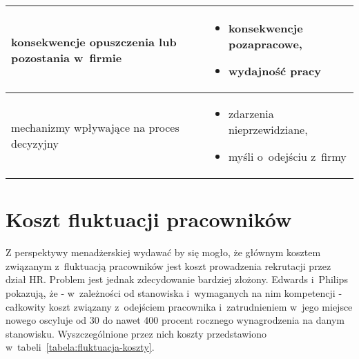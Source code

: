 \begin{table}
\begin{center}
\begin{tabular}{|P{.2\textwidth}|p{.7\textwidth}|}
            konsekwencje opuszczenia lub pozostania w~firmie &
            \begin{itemize}
                \item konsekwencje pozapracowe,
                \item wydajność pracy
            \end{itemize} \\
            \hline

            mechanizmy wpływające na proces decyzyjny &
            \begin{itemize}
                \item zdarzenia nieprzewidziane,
                \item myśli o~odejściu z~firmy
            \end{itemize} \\
            \hline
        \end{tabular}
    \end{center}
    \raggedright{}
    \vspace{0.75cm}
\end{table}


\section{Koszt fluktuacji pracowników}\label{sec:koszt-fluktuacji}

Z perspektywy menadżerskiej wydawać by się mogło, że głównym kosztem związanym z~fluktuacją pracowników jest koszt prowadzenia rekrutacji przez dział HR.
Problem jest jednak zdecydowanie bardziej złożony.
Edwards i~Philips\cite{philips-edwards-2009} pokazują, że - w~zależności od stanowiska i~wymaganych na nim kompetencji -
całkowity koszt związany z~odejściem pracownika i~zatrudnieniem w~jego miejsce nowego oscyluje od 30 do nawet 400 procent
rocznego wynagrodzenia na danym stanowisku. Wyszczególnione przez nich koszty przedstawiono w~tabeli~\ref{tabela:fluktuacja-koszty}.

